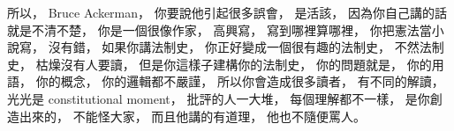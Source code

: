 \hypertarget{w02:cue:2112}{}所以，
\hypertarget{w02:cue:2113}{}Bruce Ackerman，
\hypertarget{w02:cue:2114}{}你要說他引起很多誤會，
\hypertarget{w02:cue:2115}{}是活該，
\hypertarget{w02:cue:2116}{}因為你自己講的話就是不清不楚，
\hypertarget{w02:cue:2117}{}你是一個很像作家，
\hypertarget{w02:cue:2118}{}高興寫，
\hypertarget{w02:cue:2119}{}寫到哪裡算哪裡，
\hypertarget{w02:cue:2120}{}你把憲法當小說寫，
\hypertarget{w02:cue:2121}{}沒有錯，
\hypertarget{w02:cue:2122}{}如果你講法制史，
\hypertarget{w02:cue:2123}{}你正好變成一個很有趣的法制史，
\hypertarget{w02:cue:2124}{}不然法制史，
\hypertarget{w02:cue:2125}{}枯燥沒有人要讀，
\hypertarget{w02:cue:2126}{}但是你這樣子建構你的法制史，
\hypertarget{w02:cue:2127}{}你的問題就是，
\hypertarget{w02:cue:2128}{}你的用語，
\hypertarget{w02:cue:2129}{}你的概念，
\hypertarget{w02:cue:2130}{}你的邏輯都不嚴謹，
\hypertarget{w02:cue:2131}{}所以你會造成很多讀者，
\hypertarget{w02:cue:2132}{}有不同的解讀，
\hypertarget{w02:cue:2133}{}光光是 constitutional moment，
\hypertarget{w02:cue:2134}{}批評的人一大堆，
\hypertarget{w02:cue:2135}{}每個理解都不一樣，
\hypertarget{w02:cue:2136}{}是你創造出來的，
\hypertarget{w02:cue:2137}{}不能怪大家，
\hypertarget{w02:cue:2138}{}而且他講的有道理，
\hypertarget{w02:cue:2139}{}他也不隨便罵人。

